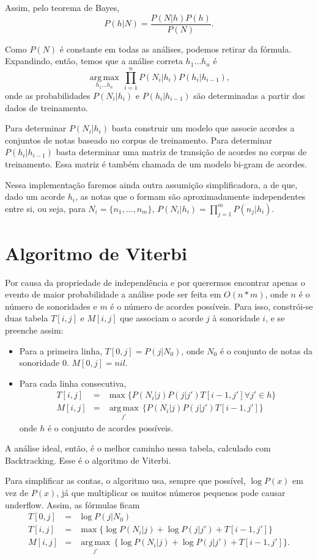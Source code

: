 \documentclass{article}
\newcommand{\argmax}[1]{\underset{#1}{\operatorname{arg\,max}}\,}
\begin{document}
Assim, pelo teorema de Bayes,
\[P(h|N) = \frac{P(N|h)P(h)}{P(N)}.\]

Como $P(N)$ é constante em todas as análises, podemos retirar da
fórmula. Expandindo, então, temos que a análise correta $h_1 \ldots
h_n$ é
\[\argmax{h_1 \ldots h_n} \prod_{i=1}^n P(N_i|h_i)P(h_i|h_{i-1}),\]
onde as probabilidades $P(N_i|h_i)$ e $P(h_i|h_{i-1})$ são
determinadas a partir dos dados de treinamento.

Para determinar $P(N_i|h_i)$ basta construir um modelo que associe
acordes a conjuntos de notas baseado no corpus de treinamento. Para
determinar $P(h_i|h_{i-1})$ basta determinar uma matriz de transição
de acordes no corpus de treinamento. Essa matriz é também chamada de
um modelo bi-gram de acordes.

Nessa implementação faremos ainda outra assumição simplificadora, a de
que, dado um acorde $h_i$, as notas que o formam são aproximadamente
independentes entre si, ou seja, para $N_i = \{n_1, \ldots , n_m\}$,
$P(N_i|h_i) = \prod_{j=1}^m P(n_j|h_i)$.

\section{Algoritmo de Viterbi}
\label{sec:viterbi}

Por causa da propriedade de independência e por querermos encontrar
apenas o evento de maior probabilidade a análise pode ser feita em
$O(n*m)$, onde $n$ é o número de sonoridades e $m$ é o número de
acordes possíveis. Para isso, constrói-se duas tabela $T[i,j]$ e
$M[i,j]$ que associam o acorde $j$ à sonoridade $i$, e se preenche
assim:
\begin{itemize}
\item Para a primeira linha, $T[0,j] = P(j|N_0)$, onde $N_0$ é
  o conjunto de notas da sonoridade $0$. $M[0,j] = nil$.
\item Para cada linha consecutiva, 
  \begin{eqnarray}
 T[i,j] &=& \operatorname{max} \{ P(N_i|j)P(j|j')T[i-1,j'] \forall j' \in h \} \\
 M[i,j] &=& \argmax{j'} \{ P(N_i|j)P(j|j')T[i-1,j'] \}
\label{eq:1}
\end{eqnarray}
onde $h$ é o conjunto de acordes possíveis.
\end{itemize}
A análise ideal, então, é o melhor caminho nessa tabela, calculado com
Backtracking. Esse é o algoritmo de Viterbi.

Para simplificar as contas, o algoritmo usa, sempre que possível,
$\log P(x)$ em vez de $P(x)$, já que multiplicar os muitos números
pequenos pode causar underflow. Assim, as fórmulas ficam
\begin{eqnarray}
T[0,j] &=& \log P(j|N_0) \\
T[i,j] &=& \operatorname{max} \{ \log P(N_i|j) + \log P(j|j') + T[i-1,j'] \} \\
M[i,j] &=& \argmax{j'} \{ \log P(N_i|j) + \log P(j|j') + T[i-1,j']\}.
\label{eq:2}
\end{eqnarray}
\end{document}
